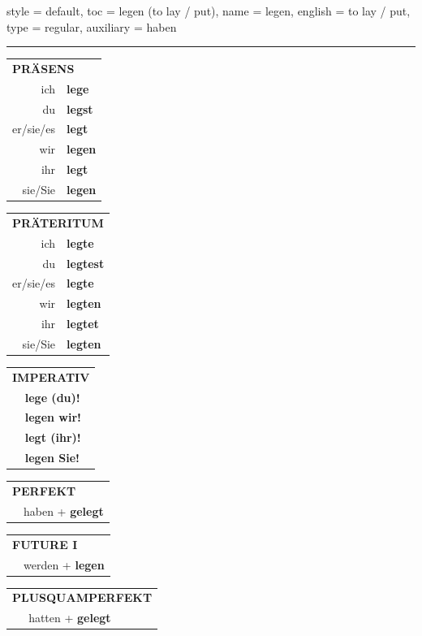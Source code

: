 \begin{verbentry}{
  style = {default},
  toc = {legen (to lay / put)},
  name = {legen},
  english = {to lay / put},
  type = {regular},
  auxiliary = {haben}
}


\vspace{5pt}
\hrule
\vspace{5pt}

\begin{tabular}{rl}
\multicolumn{2}{l}{\textbf{PRÄSENS}}\\
ich & \textbf{lege}\\
du & \textbf{legst}\\
er/sie/es & \textbf{legt}\\
wir & \textbf{legen}\\
ihr & \textbf{legt}\\
sie/Sie & \textbf{legen}\\
\end{tabular}
\hfill
\begin{tabular}{rl}
\multicolumn{2}{l}{\textbf{PRÄTERITUM}}\\
ich & \textbf{legte}\\
du & \textbf{legtest}\\
er/sie/es & \textbf{legte}\\
wir & \textbf{legten}\\
ihr & \textbf{legtet}\\
sie/Sie & \textbf{legten}\\
\end{tabular}
\hfill
\begin{tabular}{rl}
\multicolumn{2}{l}{\textbf{IMPERATIV}}\\
& \textbf{lege (du)!}\\
& \textbf{legen wir!}\\
& \textbf{legt (ihr)!}\\
& \textbf{legen Sie!}\\
\end{tabular}

\vspace{10pt}

\begin{tabular}{rl}
\multicolumn{2}{l}{\textbf{PERFEKT}}\\
& haben + \textbf{gelegt}\\
\end{tabular}
\hfill
\begin{tabular}{rl}
\multicolumn{2}{l}{\textbf{FUTURE I}}\\
& werden + \textbf{legen}\\
\end{tabular}
\hfill
\begin{tabular}{rl}
\multicolumn{2}{l}{\textbf{PLUSQUAMPERFEKT}}\\
& hatten + \textbf{gelegt}\\
\end{tabular}


\end{verbentry}

